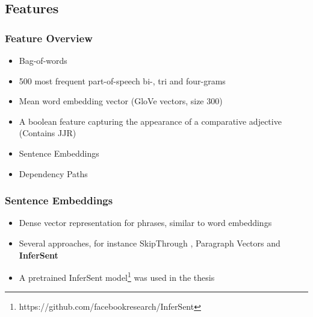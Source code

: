\documentclass[11pt,aspectratio=169,usenames,dvipsnames]{beamer}
\begin{document}
    \subsection{Features}
    \frame{\subsectionpage}
    
    
    \begin{frame}[t]
        \frametitle{Feature Overview}
        \begin{itemize}
            \item Bag-of-words
            \item 500 most frequent part-of-speech bi-, tri and four-grams
            \item Mean word embedding vector (GloVe vectors, size 300)
            \item A boolean feature capturing the appearance of a comparative adjective (Contains JJR)
            \item Sentence Embeddings
            \item Dependency Paths
        \end{itemize}
      
    \end{frame}
    
    \begin{frame}[t]
        \frametitle{Sentence Embeddings}
        \begin{itemize}
            \item Dense vector representation for phrases, similar to word embeddings\pause
            \item Several approaches, for instance SkipThrough \cite{NIPS2015_5950}, Paragraph Vectors \cite{Le:2014aa} and \textbf{InferSent} \cite{Conneau:2017aa}
            \item A pretrained InferSent model\footnote{https://github.com/facebookresearch/InferSent} was used in the thesis
        \end{itemize}


    \end{frame}
\end{document}
